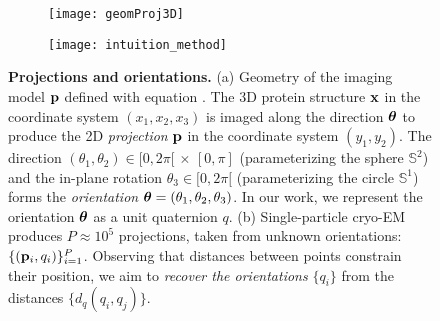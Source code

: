 \begin{figure}
    \centering
    \begin{subfigure}[t]{0.45\linewidth}
        \centering
        \texttt{[image: geomProj3D]}
        \caption{}
        \label{fig:imaging-geometry}
    \end{subfigure}
    \qquad
    \begin{subfigure}[t]{0.45\linewidth}
        \centering
        \texttt{[image: intuition\_method]}
        \caption{}
        \label{fig:intuition-method}
    \end{subfigure}
\caption{%
    \textbf{Projections and orientations.}
    (a) Geometry of the imaging model $\mathbf{p}$ defined with equation .
    The 3D protein structure $\mathbf{x}$ in the coordinate system $(x_1, x_2, x_3)$ is imaged along the direction ${\boldsymbol{\theta}}$ to produce the 2D \textit{projection} $\mathbf{p}$ in the coordinate system $(y_1, y_2)$.
    The direction $(\theta_1, \theta_2) \in [0,2\pi[ \, \times \, [0,\pi]$ (parameterizing the sphere $\mathbb{S}^2$) and the in-plane rotation $\theta_3 \in [0,2\pi[$ (parameterizing the circle $\mathbb{S}^1$) forms the \textit{orientation} ${\boldsymbol{\theta}} = (\theta_1, \theta_2, \theta_3)$.
    In our work, we represent the orientation ${\boldsymbol{\theta}}$ as a unit quaternion $q$.
    (b) Single-particle cryo-EM produces $P \approx 10^5$ projections, taken from unknown orientations: $\{(\mathbf{p}_i, q_i)\}_{i=1}^P$.
    Observing that distances between points constrain their position, we aim to \textit{recover the orientations} $\{q_i\}$ from the distances $\{d_q(q_i, q_j)\}$.
}
\end{figure}
